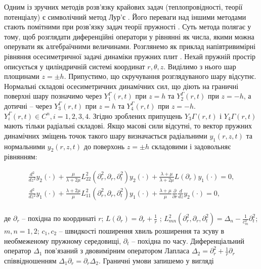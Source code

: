 Одним із зручних методів розв’язку крайових задач (теплопровідності, теорії потенціалу) є
символічний метод Лур’є \cite{Lurie-Prostranstvennye}. Його переваги над іншими методами стають помітними
при розв’язку задач теорії пружності \cite{Lurie-KTeorii, Stoyan-ProRivniannia}. Суть метода полягає у
тому, щоб розглядати диференційні оператори у рівнянні як числа, якими можна оперувати як
алгебраїчними величинами. Розглянемо як приклад напівтривимірні рівняння осесиметричної задачі
динаміки пружних плит \cite{Skopetskiy-Matematychne}. Нехай пружній простір описується у циліндричній
системі координат $r,\theta, z$. Виділимо з нього шар площинами $z=\pm h$. Припустимо, що скручування
розглядуваного шару
відсутнє. Нормальні складові осесиметричних динамічних сил, що діють на граничні поверхні
шару позначимо через $Y_1^\Gamma(r, t)$ при $z = h$ та $Y_2^\Gamma(r, t)$ при $z=-h$, а дотичні –
через $Y_3^\Gamma(r, t)$ при $z=h$ та $Y_4^\Gamma(r, t)$ при $z=-h$.
$Y_i^\Gamma(r, t) \in C^n, i=1,2,3,4.$
Згідно зроблених припущень $Y_3\Gamma(r,t)$ і $Y_4\Gamma(r,t)$ мають тільки радіальні складові.
Якщо масові сили відсутні, то
вектор пружних динамічних зміщень точок такого шару визначається
радіальними $y_1(r, z, t)$ та нормальними $y_2(r, z, t)$ до
поверхонь $z=\pm h$ складовими \cite{Skopetskiy-Matematychne} і задовольняє рівнянням:

\begin{equation}
\label{eq:dinamika_plity}
\begin{multlined}
\frac{d^2}{dz^2}y_2(\cdot) + \frac{\mu}{\lambda + 2\mu}L_{22}^2(\partial_r^2, \partial_r, \partial_t^2)y_2(\cdot)+
\frac{\lambda + \mu}{\lambda + 2\mu}L(\partial_r)y_1(\cdot) = 0, \\
\frac{d^2}{dz^2}y_1(\cdot) + \frac{\lambda + 2\mu}{\mu}L_{11}^2(\partial_r^2, \partial_r, \partial_t^2)y_1(\cdot)+
\frac{\lambda + \mu}{\mu}\frac{\partial}{\partial r}\frac{d}{dz}y_2(\cdot) = 0, \\
\end{multlined}
\end{equation}


де $\partial_r$ – похідна по координаті $r$; $L(\partial_r) = \partial_r + \frac{1}{r}$ ;
$L_{mn}^2(\partial_r^2, \partial_r, \partial_t^2) = \Delta_n - \frac{1}{c_m^2}\partial_t^2$;
$m, n = 1, 2$; $c_1, c_2$ – швидкості поширення хвиль розши­рення та зсуву в
необмеженому пружному середовищі, $\partial_t$ – похідна по часу. Диференціальний оператор $\Delta_1$
пов’язаний з двовимірним оператором Лапласа $\Delta_2 = \partial_r^2 + \frac{1}{r}\partial_r$
співвідношенням $\Delta_1 \partial_r = \partial_r \Delta_2$. Граничні умови запишемо у вигляді

